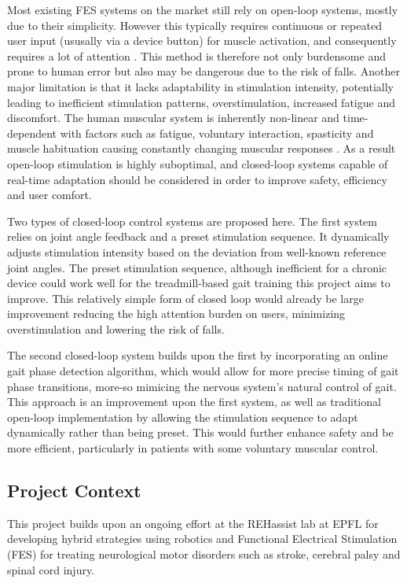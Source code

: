 Most existing FES systems on the market still rely on open-loop systems, mostly due to their simplicity\cite{braz_functional_2009}. However this typically requires continuous or repeated user input (ususally via a device button) for muscle activation, and consequently requires a lot of attention \cite{hayami_development_2022}. This method is therefore not only burdensome and prone to human error but also may be dangerous due to the risk of falls. Another major limitation is that it lacks adaptability in stimulation intensity, potentially leading to inefficient stimulation patterns, overstimulation, increased fatigue and discomfort. The human muscular system is inherently non-linear and time-dependent with factors such as fatigue, voluntary interaction, spasticity and muscle habituation causing constantly changing muscular responses . As a result open-loop stimulation is highly suboptimal, and closed-loop systems capable of real-time adaptation should be considered in order to improve safety, efficiency and user comfort.

Two types of closed-loop control systems are proposed here. The first system relies on joint angle feedback and a preset stimulation sequence. It dynamically adjusts stimulation intensity based on the deviation from well-known reference joint angles. The preset stimulation sequence, although inefficient for a chronic device could work well for the treadmill-based gait training this project aims to improve. This relatively simple form of closed loop would already be large improvement reducing the high attention burden on users, minimizing overstimulation and lowering the risk of falls.  

The second closed-loop system builds upon the first by incorporating an online gait phase detection algorithm, which would allow for more precise timing of gait phase transitions, more-so mimicing the nervous system's natural control of gait. This approach is an improvement upon the first system, as well as traditional open-loop implementation by allowing the stimulation sequence to adapt dynamically rather than being preset. This would further enhance safety and be more efficient, particularly in patients with some voluntary muscular control.



\subsection{Project Context}

This project builds upon an ongoing effort at the REHassist lab at EPFL for developing hybrid strategies using robotics and Functional Electrical Stimulation (FES) for treating neurological motor disorders such as stroke, cerebral palsy and spinal cord injury. 

